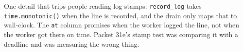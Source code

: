 One detail that trips people reading log stamps: \texttt{record\_log} takes \texttt{time.monotonic()}
when the line is recorded, and the drain only maps that to wall-clock. The \texttt{at} column promises
when the worker logged the line, not when the worker got there on time. Packet 31e's stamp test was
comparing it with a deadline and was measuring the wrong thing.

